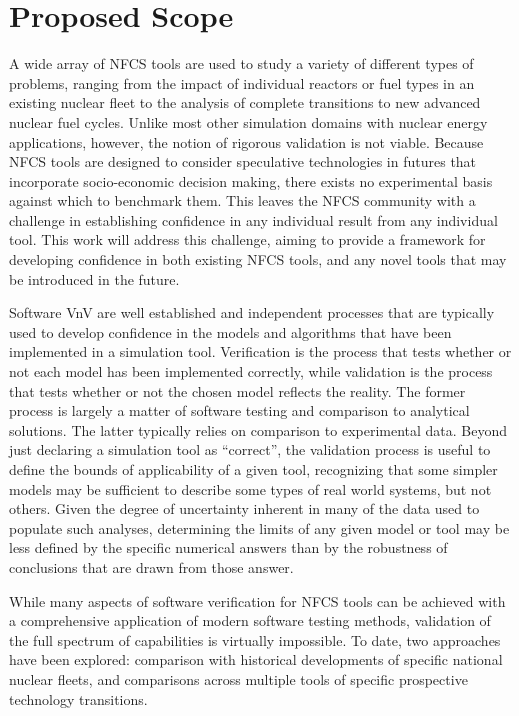 \section{Proposed Scope}

A wide array of \gls{NFCS} tools\cite{DYMOND, ORION, VISION, COSI6, CLASS,
CYCLUS} are used to study a variety of different types of problems, ranging from
the impact of individual reactors or fuel types in an existing nuclear
fleet\cite{ZAKARI.ANE.2016} to the analysis of complete transitions to new
advanced nuclear fuel cycles\cite{hoffman.ICAPP.2016}.  Unlike most other
simulation domains with nuclear energy applications, however, the notion of
rigorous validation is not viable.  Because \gls{NFCS} tools are designed to
consider speculative technologies in futures that incorporate socio-economic
decision making, there exists no experimental basis against which to benchmark
them.  This leaves the \gls{NFCS} community with a challenge in establishing
confidence in any individual result from any individual tool.  This work will
address this challenge, aiming to provide a framework for developing confidence
in both existing \gls{NFCS} tools, and any novel tools that may be introduced in
the future.

Software \gls{VnV} are well established and independent processes that are
typically used to develop confidence in the models and algorithms that have
been implemented in a simulation tool.  Verification is the process that tests
whether or not each model has been implemented correctly, while validation is
the process that tests whether or not the chosen model reflects the reality.
The former process is largely a matter of software testing and comparison to
analytical solutions.  The latter typically relies on comparison to
experimental data.  Beyond just declaring a simulation tool as ``correct'',
the validation process is useful to define the bounds of applicability of a
given tool, recognizing that some simpler models may be sufficient to describe
some types of real world systems, but not others.  Given the degree of
uncertainty inherent in many of the data used to populate such analyses,
determining the limits of any given model or tool may be less defined by the
specific numerical answers than by the robustness of conclusions that are
drawn from those answer.  

While many aspects of software verification for \gls{NFCS} tools can be
achieved with a comprehensive application of modern software testing methods,
validation of the full spectrum of capabilities is virtually impossible.  To
date, two approaches have been explored: comparison with historical
developments of specific national nuclear fleets, and comparisons across
multiple tools of specific prospective technology transitions.

